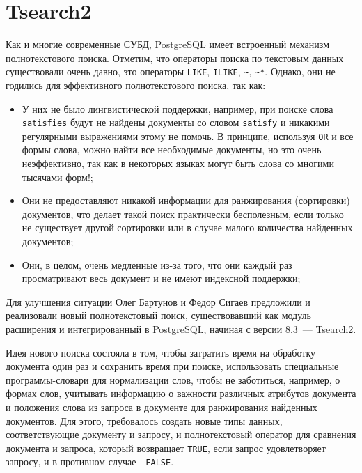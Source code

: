 \section{Tsearch2}

Как и многие современные СУБД, PostgreSQL имеет встроенный механизм полнотекстового поиска. Отметим, что операторы поиска по текстовым данных существовали очень давно, это операторы \lstinline!LIKE!, \lstinline!ILIKE!, \lstinline!~!, \lstinline!~*!. Однако, они не годились для эффективного полнотекстового поиска, так как:

\begin{itemize}
  \item У них не было лингвистической поддержки, например, при поиске слова \lstinline!satisfies! будут не найдены документы со словом \lstinline!satisfy! и никакими регулярными выражениями этому не помочь. В принципе, используя \lstinline!OR! и все формы слова, можно найти все необходимые документы, но это очень неэффективно, так как в некоторых языках могут быть слова со многими тысячами форм!;
  \item Они не предоставляют никакой информации для ранжирования (сортировки) документов, что делает такой поиск практически бесполезным, если только не существует другой сортировки или в случае малого количества найденных документов;
  \item Они, в целом, очень медленные из-за того, что они каждый раз просматривают весь документ и не имеют индексной поддержки;
\end{itemize}

Для улучшения ситуации Олег Бартунов и Федор Сигаев предложили и реализовали новый полнотекстовый поиск, существовавший как модуль расширения и интегрированный в PostgreSQL, начиная с версии 8.3~--- \href{https://www.postgresql.org/docs/current/static/tsearch2.html}{Tsearch2}.

Идея нового поиска состояла в том, чтобы затратить время на обработку документа один раз и сохранить время при поиске, использовать специальные программы-словари для нормализации слов, чтобы не заботиться, например, о формах слов, учитывать информацию о важности различных атрибутов документа и положения слова из запроса в документе для ранжирования найденных документов. Для этого, требовалось создать новые типы данных, соответствующие документу и запросу, и полнотекстовый оператор для сравнения документа и запроса, который возвращает \lstinline!TRUE!, если запрос удовлетворяет запросу, и в противном случае - \lstinline!FALSE!.


